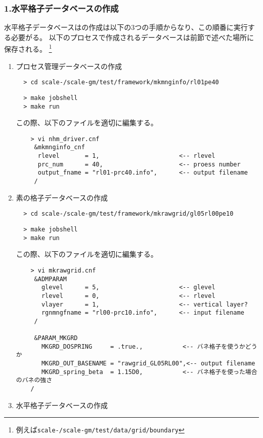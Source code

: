 \subsubsection{1.水平格子データベースの作成}
水平格子データベースはの作成は以下の3つの手順からなり、この順番に実行する必要がる。
以下のプロセスで作成されるデータベースは前節で述べた場所に保存される。
\footnote{例えば\texttt{scale-{\version}/scale-gm/test/data/grid/boundary}}
\renewcommand{\labelenumi}{(\roman{enumi})}
\begin{enumerate}

\item{プロセス管理データベースの作成} 

\verb|  > cd scale-|{\version}\verb|/scale-gm/test/framework/mkmnginfo/rl01pe40|
\vspace{-4mm}
\begin{verbatim}
  > make jobshell
  > make run
\end{verbatim}
 この際、以下のファイルを適切に編集する。
 \begin{verbatim}
    > vi nhm_driver.cnf
     &mkmnginfo_cnf
      rlevel       = 1,                      <-- rlevel 
      prc_num      = 40,                     <-- proess number
      output_fname = "rl01-prc40.info",      <-- output filename
     /
 \end{verbatim}

\item{素の格子データベースの作成}

\verb|  > cd scale-|{\version}\verb|/scale-gm/test/framework/mkrawgrid/gl05rl00pe10|
\vspace{-4mm}
\begin{verbatim}
  > make jobshell
  > make run
\end{verbatim}
 この際、以下のファイルを適切に編集する。
 \begin{verbatim}
    > vi mkrawgrid.cnf
     &ADMPARAM
       glevel      = 5,                      <-- glevel
       rlevel      = 0,                      <-- rlevel
       vlayer      = 1,                      <-- vertical layer?
       rgnmngfname = "rl00-prc10.info",      <-- input filename 
     /

     &PARAM_MKGRD
       MKGRD_DOSPRING     = .true.,           <-- バネ格子を使うかどうか
       MKGRD_OUT_BASENAME = "rawgrid_GL05RL00",<-- output filename
       MKGRD_spring_beta  = 1.15D0,           <-- バネ格子を使った場合のバネの強さ
    /
 \end{verbatim}


\item{水平格子データベースの作成}


\end{enumerate}
